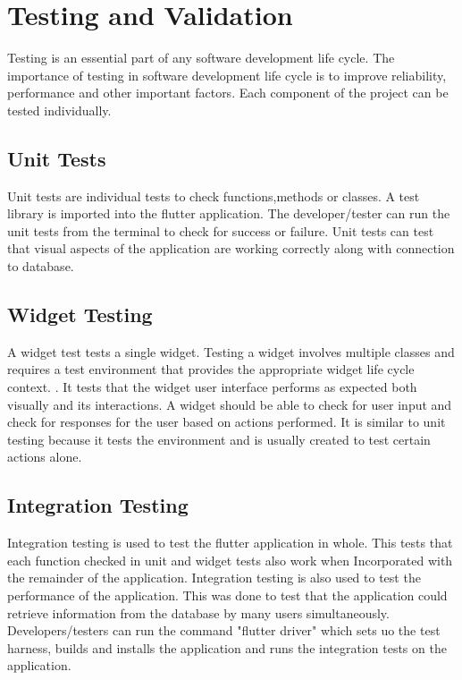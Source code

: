\section{Testing and Validation}
Testing is an essential part of any software development life cycle. The importance of testing in software development life cycle is to improve reliability, performance and other important factors.\cite{TestingLifeCycle} Each component of the project can be tested individually.
 
\subsection{Unit Tests}

Unit tests are individual tests to check functions,methods or classes. A test library is imported into the flutter application. The developer/tester can run the unit tests from the terminal to check for success or failure. Unit tests can test that visual aspects of the application are working correctly along with connection to database.

\subsection{Widget Testing}

A widget test tests a single widget. Testing a widget involves multiple classes and requires a test environment that provides the appropriate widget life cycle context. \cite{testing}. It tests that the widget user interface performs as expected both visually and its interactions. A widget should be able to check for user input and check for responses for the user based on actions performed. It is similar to unit testing because it tests the environment and is usually created to test certain actions alone.

\subsection{Integration Testing}

Integration testing is used to test the flutter application in whole. This tests that each function checked in unit and widget tests also work when Incorporated with the remainder of the application. Integration testing is also used to test the performance of the application. This was done to test that the application could retrieve information from the database by many users simultaneously. Developers/testers can run the command "flutter driver" which sets uo the test harness, builds and installs the application and runs the integration tests on the application. \cite{IntegrationTest}

